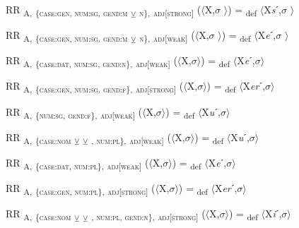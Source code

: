 \ea%
\label{ex:key:88}
 RR \textsubscript{A,} \textsubscript{\{\textsc{case:gen}, \textsc{num:sg}, \textsc{gend:m}} \textsubscript{\tiny $\veebar$}\textsubscript{ \textsc{n}\},} \textsubscript{\textsc{adj[strong]}} ($\langle$X,$\sigma$ $\rangle$) = \textsubscript{def} $\langle$X\textit{s}ˊ,$\sigma$ $\rangle$
\z

\ea%
\label{ex:key:89}
 RR \textsubscript{A,} \textsubscript{\{\textsc{case:gen}, \textsc{num:sg}, \textsc{gend:m}} \textsubscript{\tiny $\veebar$}\textsubscript{ \textsc{n}\},} \textsubscript{\textsc{adj[weak]}} ($\langle$X,$\sigma$ $\rangle$) = \textsubscript{def} $\langle$X\textit{e}ˊ,$\sigma$ $\rangle$ 
\z

\ea%
\label{ex:key:90}
 RR \textsubscript{A,} \textsubscript{\{\textsc{case:dat}, \textsc{num:sg}, \textsc{gend:n}\},} \textsubscript{\textsc{adj[weak]}} ($\langle$X,$\sigma$$\rangle$) = \textsubscript{def} $\langle$X\textit{e}ˊ,$\sigma$$\rangle$
\z

\ea%
\label{ex:key:91}
 RR \textsubscript{A,} \textsubscript{\{\textsc{case:gen}, \textsc{num:sg}, \textsc{gend:f}\},} \textsubscript{\textsc{adj[strong]}} ($\langle$X,$\sigma$$\rangle$) = \textsubscript{def} $\langle$X\textit{er}ˊ,$\sigma$$\rangle$
\z

\ea%
\label{ex:key:92}
 RR \textsubscript{A,} \textsubscript{\{\textsc{num:sg}, \textsc{gend:f}\},} \textsubscript{\textsc{adj[weak]}} ($\langle$X,$\sigma$$\rangle$) = \textsubscript{def} $\langle$X\textit{u}ˊ,$\sigma$$\rangle$
\z

\ea%
\label{ex:key:93}
 RR \textsubscript{A,} \textsubscript{\{\textsc{case:nom}} \textsubscript{\tiny $\veebar$}\textsubscript{ \AKK} \textsubscript{\tiny $\veebar$}\textsubscript{ \GEN, \textsc{num:pl}\},} \textsubscript{\textsc{adj[weak]}} ($\langle$X,$\sigma$$\rangle$) = \textsubscript{def} $\langle$X\textit{u}ˊ,$\sigma$$\rangle$
\z

\ea%
\label{ex:key:94}
 RR \textsubscript{A,} \textsubscript{\{\textsc{case:dat}, \textsc{num:pl}\},} \textsubscript{\textsc{adj[weak]}} ($\langle$X,$\sigma$$\rangle$) = \textsubscript{def} $\langle$X\textit{e}ˊ,$\sigma$$\rangle$
\z

\ea%
\label{ex:key:95}
 RR \textsubscript{A,} \textsubscript{\{\textsc{case:gen}, \textsc{num:pl}\},} \textsubscript{\textsc{adj[strong]}} ($\langle$X,$\sigma$$\rangle$) = \textsubscript{def} $\langle$X\textit{er}ˊ,$\sigma$$\rangle$
\z

\ea%
\label{ex:key:96}
 RR \textsubscript{A,} \textsubscript{\{\textsc{case:nom}} \textsubscript{\tiny $\veebar$}\textsubscript{ \AKK} \textsubscript{\tiny  $\veebar$}\textsubscript{ \DAT, \textsc{num:pl}, \textsc{gend:n}\},} \textsubscript{\textsc{adj[strong]}} ($\langle$X,$\sigma$$\rangle$) = \textsubscript{def} $\langle$X\textit{i}ˊ,$\sigma$$\rangle$
\z

